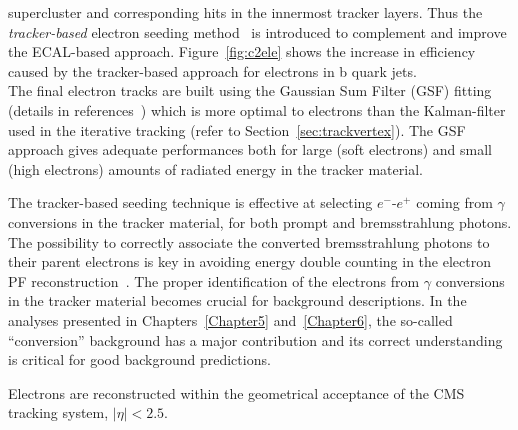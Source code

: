 supercluster and corresponding hits in the innermost tracker layers.
Thus the \emph{tracker-based} electron seeding
method~\cite{CMS:particleflow} is introduced to complement and improve
the ECAL-based approach. Figure~\ref{fig:c2ele} shows the increase in efficiency caused by the tracker-based approach for electrons in b quark jets.\\
The final electron tracks are built using the Gaussian Sum Filter
(GSF) fitting (details in references~\cite{CMS:particleflow, Adam_2005}) which is more optimal to electrons than the Kalman-filter used
in the iterative tracking (refer to
Section~\ref{sec:trackvertex}). The GSF approach gives adequate
performances both for large (\ie soft electrons) and small (\ie high \pt electrons) amounts of radiated energy in the
tracker material.

The tracker-based seeding technique is effective at selecting $e^{-}$-$e^{+}$ coming from $\gamma$ conversions
in the tracker material, for both prompt and bremsstrahlung
photons. The possibility to correctly associate the converted
bremsstrahlung photons
to their parent electrons is key in avoiding energy double
counting in the electron PF reconstruction~\cite{CMS:particleflow}. The proper identification
of the electrons from $\gamma$ conversions
in the tracker material becomes crucial for background descriptions. In
the analyses presented in
Chapters~\ref{Chapter5} and~\ref{Chapter6}, the so-called
``conversion'' background has a major contribution and its correct
understanding is critical for good background
predictions.

Electrons are reconstructed within the geometrical acceptance of the
CMS tracking system, $|\eta|<2.5$.

